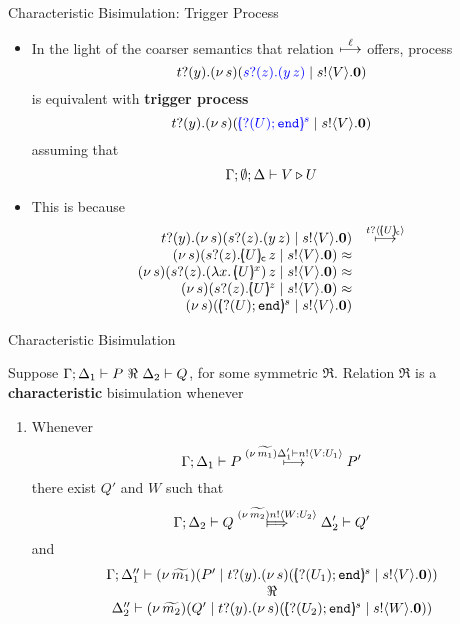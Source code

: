 \documentclass{beamer}
\newcommand{\prcolor}[1]{{\color{blue} #1}}
\begin{document}
	\begin{frame}{Characteristic Bisimulation: Trigger Process}
		\begin{itemize}
			\item	In the light of the coarser semantics that
				relation $\stackrel{\ell}{\longmapsto}$ offers, process
				\[
					\binp{t}{y}\newsp{s}{\prcolor{\binp{s}{z} (\appl{y}{z})} \Par \bout{s}{V} \inact}
				\]
				is equivalent with {\bf trigger process}
				\[
					\binp{t}{y}\newsp{s}{\prcolor{\mapchar{\btinp{U} \tinact}{s}} \Par \bout{s}{V} \inact}
				\]
				assuming that
				\[
					\Gamma; \emptyset; \Delta \vdash V \triangleright U
				\]
			\item	This is because
				\[
					\begin{array}{rl}
						\binp{t}{y} \newsp{s}{\binp{s}{z} (\appl{y}{z}) \Par \bout{s}{V} \inact}
						&\hby{\bactinp{t}{\omapchar{U}}} \\
						\newsp{s}{\binp{s}{z} \appl{\omapchar{U}}{z} \Par \bout{s}{V} \inact} \wbc \\
						\newsp{s}{\binp{s}{z} \appl{(\abs{x}{\mapchar{U}{x}})}{z} \Par \bout{s}{V} \inact} \wbc \\
						\newsp{s}{\binp{s}{z} \mapchar{U}{z} \Par \bout{s}{V} \inact} \wbc \\
						\newsp{s}{\mapchar{\btinp{U} \tinact}{s} \Par \bout{s}{V} \inact} %
					\end{array}
				\]
		\end{itemize}
	\end{frame}

	\begin{frame}{Characteristic Bisimulation}

		Suppose $\Gamma; \Delta_1 \vdash P\ \Re\ \Delta_2 \vdash Q$, for some symmetric $\Re$. Relation $\Re$ is a
		{\bf characteristic} bisimulation whenever
		\begin{enumerate}[$(\star)$]
			\item	Whenever
				\[
					\Gamma; \Delta_1 \vdash P \stackrel{(\nu\, \widetilde{m_1}) \Delta_1' \vdash n ! \langle V: U_1 \rangle}{\longmapsto} P'
				\]
				there exist $Q'$ and $W$ such that 
				\[
					\Gamma; \Delta_2 \proves Q \Hby{\news{\widetilde{m_2}} \bactout{n}{W: U_2}} \Delta_2' \proves Q'
				\]
				and
				\[
					\begin{array}{c}
						\Gamma; \Delta_1'' \proves \newsp{\widetilde{m_1}}{P' \Par \binp{t}{y}\newsp{s}{\mapchar{\btinp{U_1} \tinact}{s} \Par \bout{s}{V} \inact}}
						\\
						\Re
						\\
						\Delta_2'' \proves \newsp{\widetilde{m_2}}{Q' \Par \binp{t}{y}\newsp{s}{\mapchar{\btinp{U_2} \tinact}{s} \Par \bout{s}{W} \inact}}
					\end{array}
				\]
		\end{enumerate}
	\end{frame}
\end{document}
